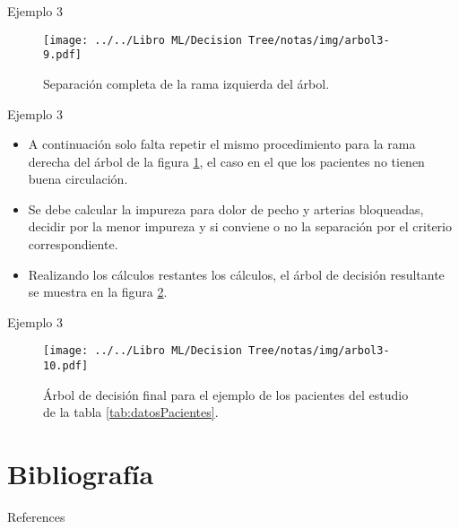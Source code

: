 \documentclass[11pt,aspectratio=169]{beamer}
\begin{document}
\begin{frame}{Ejemplo 3}
	\begin{figure}[H]
		\centering
		\texttt{[image: ../../Libro ML/Decision Tree/notas/img/arbol3-9.pdf]}
		\caption{Separación completa de la rama izquierda del árbol.}
		\label{fig:arbol3-9}
	\end{figure}
\end{frame}

\begin{frame}{Ejemplo 3}
	\begin{itemize}
		\item A continuación solo falta repetir el mismo procedimiento para la rama derecha del árbol de la figura \ref{fig:arbol3-9}, 
			el caso en el que los pacientes no tienen buena circulación. \pause
		\item Se debe calcular la impureza para dolor de pecho y arterias bloqueadas, decidir por la menor impureza y si conviene o no la separación por el criterio
			correspondiente.\pause 
		\item Realizando los cálculos restantes los cálculos, el árbol de decisión resultante se muestra en la figura \ref{fig:arbol3-10}. 
	\end{itemize}
\end{frame}

\begin{frame}{Ejemplo 3}
	\begin{figure}[H]
		\centering
		\texttt{[image: ../../Libro ML/Decision Tree/notas/img/arbol3-10.pdf]}
		\caption{Árbol de decisión final para el ejemplo de los pacientes del estudio de la tabla \ref{tab:datosPacientes}.}
		\label{fig:arbol3-10}
	\end{figure}
\end{frame}

\section{Bibliografía}
\begin{frame}[allowframebreaks]{References}
    \nocite{*}
    
    
\end{frame}
\end{document}
